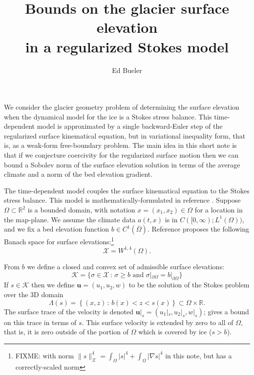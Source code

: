 \documentclass[12pt]{article}
\title{Bounds on the glacier surface elevation \\ in a regularized Stokes model}
\author{Ed Bueler}
\newcommand{\RR}{\ensuremath{\mathbb R}}
\newcommand{\bu}{\ensuremath{\mathbf{u}}}
\newcommand{\cK}{\ensuremath{\mathcal{K}}}
\newcommand{\cX}{\ensuremath{\mathcal{X}}}
\newcommand{\grad}{\ensuremath{\nabla}}
\begin{document}
\maketitle

We consider the glacier geometry problem of determining the surface elevation when the dynamical model for the ice is a Stokes stress balance.  This time-dependent model is approximated by a single backward-Euler step of the regularized surface kinematical equation, but in variational inequality form, that is, as a weak-form free-boundary problem.  The main idea in this short note is that if we conjecture coercivity for the regularized surface motion then we can bound a Sobolev norm of the surface elevation solution in terms of the average climate and a norm of the bed elevation gradient.

The time-dependent model couples the surface kinematical equation to the Stokes stress balance.  This model is mathematically-formulated in reference \cite{Bueler2025}.  Suppose $\Omega\subset \RR^2$ is a bounded domain, with notation $x=(x_1,x_2)\in\Omega$ for a location in the map-plane.  We assume the climate data $a(t,x)$ is in $C([0,\infty); L^1(\Omega))$, and we fix a bed elevation function $b\in C^1(\bar\Omega)$.   Reference \cite{Bueler2025} proposes the following Banach space for surface elevations:\footnote{FIXME: with norm $\|s\|_{\cX}^4 = \int_\Omega |s|^4 + \int_\Omega |\grad s|^4$ in this note, but \cite{Bueler2025} has a correctly-scaled norm}
\begin{equation}
\cX = W^{1,4}(\Omega). \label{eq:defineX}
\end{equation}

From $b$ we define a closed and convex set of admissible surface elevations:
\begin{equation}
\cK=\{\sigma\in\cX\,:\,\sigma\ge b \text{ and } \sigma|_{\partial\Omega}=b|_{\partial\Omega}\} \label{eq:defineK}
\end{equation}
If $s\in \cK$ then we define $\bu=(u_1,u_2,w)$ to be the solution of the Stokes problem over the 3D domain
\begin{equation}
\Lambda(s) = \left\{(x,z)\,:\,b(x) < z < s(x)\right\} \subset \Omega \times \RR. \label{eq:domainfroms}
\end{equation}
The surface trace of the velocity is denoted $\bu|_s=(u_1|_s,u_2|_s,w|_s)$; \cite{Bueler2025} gives a bound on this trace in terms of $s$.  This surface velocity is extended by zero to all of $\Omega$, that is, it is zero outside of the portion of $\Omega$ which is covered by ice ($s>b$).
\end{document}
